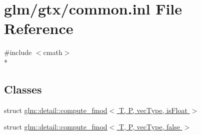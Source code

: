\hypertarget{common_8inl}{\section{glm/gtx/common.inl File Reference}
\label{common_8inl}
}
{\ttfamily \#include $<$cmath$>$}\\*
\subsection*{Classes}
\begin{DoxyCompactItemize}
\item 
struct \hyperlink{structglm_1_1detail_1_1compute__fmod}{glm\-::detail\-::compute\-\_\-fmod$<$ T, P, vec\-Type, is\-Float $>$}
\item 
struct \hyperlink{structglm_1_1detail_1_1compute__fmod_3_01T_00_01P_00_01vecType_00_01false_01_4}{glm\-::detail\-::compute\-\_\-fmod$<$ T, P, vec\-Type, false $>$}
\end{DoxyCompactItemize}
